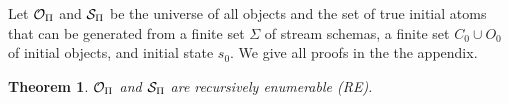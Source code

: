 \documentclass[letterpaper]{article} %
\theoremstyle{plain}\newtheorem{thm}{Theorem}
\theoremstyle{definition}\newtheorem{defn}{Definition}
\theoremstyle{plain}\newtheorem{lem}{Lemma}
\theoremstyle{plain}\newtheorem{cor}{Corollary}
\begin{document}
Let ${\cal O}_\Pi$ and ${\cal S}_\Pi$ be the universe of all objects and the set of true initial atoms
that can be generated from
a finite set $\Sigma$ of stream schemas, a finite set $C_0 \cup O_0$ of
initial objects, and initial state $s_0$. We give all proofs in the the appendix.
\begin{thm}  \label{thm:re}
${\cal O}_\Pi$ and ${\cal S}_\Pi$ are recursively enumerable (RE). 
\end{thm}

\end{document}
